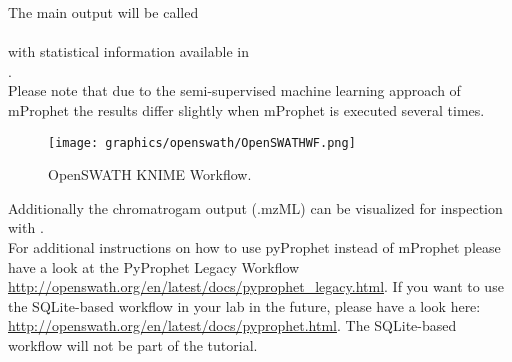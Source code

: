 \begin{comment}
\noindent If you have a valid python installation, pyProphet can be used. Further instructions the installation of python can be found in the pyOpenMS section. 

\noindent Installation of the current stable version:
\begin{listing}
\begin{verbatim}
pip install pyprophet
\end{verbatim}
\end{listing}

\noindent The following command should provide similar results to the mProphet script:
\begin{listing}
\begin{verbatim}
pyprophet score --in OpenSWATH_quant.tsv --out OpenSWATH_quant_scoring.tsv --group_id transition_group_id --pi0_lambda 1e-6 1e-2 1e-6
\end{verbatim}
\end{listing}
\end{comment}

\noindent The main output will be called\\
\\
with statistical information available in\\
.\\

\noindent Please note that due to the semi-supervised machine learning approach of mProphet the results differ slightly when mProphet is executed several times. \\

\begin{figure}[!ht]
  \texttt{[image: graphics/openswath/OpenSWATHWF.png]}
  \caption{OpenSWATH KNIME Workflow.}
  \label{fig:openswath}
\end{figure}

\noindent Additionally the chromatrogam output (.mzML) can be visualized for inspection with . \\

\noindent For additional instructions on how to use pyProphet instead of mProphet please have a look at the PyProphet Legacy Workflow \url{http://openswath.org/en/latest/docs/pyprophet_legacy.html}. If you want to use the SQLite-based workflow in your lab in the future, please have a look here: \url{http://openswath.org/en/latest/docs/pyprophet.html}. The SQLite-based workflow will not be part of the tutorial. \\

